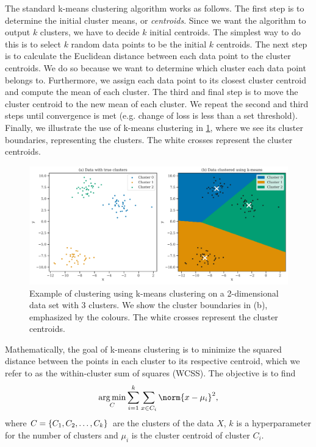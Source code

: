 The standard k-means clustering algorithm works as follows. The first step is to determine the initial cluster means, or \textit{centroids}. Since we want the algorithm to output $k$ clusters, we have to decide $k$ initial centroids. The simplest way to do this is to select $k$ random data points to be the initial $k$ centroids. The next step is to calculate the Euclidean distance between each data point to the cluster centroids. We do so because we want to determine which cluster each data point belongs to. Furthermore, we assign each data point to its closest cluster centroid and compute the mean of each cluster. The third and final step is to move the cluster centroid to the new mean of each cluster. We repeat the second and third steps until convergence is met (e.g. change of loss is less than a set threshold). Finally, we illustrate the use of k-means clustering in \cref{fig:k-means-clustering-2d-example}, where we see its cluster boundaries, representing the clusters. The white crosses represent the cluster centroids.
\begin{figure}[H]
    \centering
    \includegraphics[width=\textwidth]{thesis/figures/k-means-clustering-2d-example.pdf}
    \caption{Example of clustering using k-means clustering on a 2-dimensional data set with 3 clusters. We show the cluster boundaries in (b), emphasized by the colours. The white crosses represent the cluster centroids.}
    \label{fig:k-means-clustering-2d-example}
\end{figure}

Mathematically, the goal of k-means clustering is to minimize the squared distance between the points in each cluster to its respective centroid, which we refer to as the within-cluster sum of squares (WCSS). The objective is to find
\begin{align}
    \argmin_{C} \sumlim{i=1}{k} \sumlim{x \in C_i}{} \norm{x - \mu_i}^2,
\end{align}
where $C = \left\{C_1, C_2, \ldots, C_k\right\}$ are the clusters of the data $X$, $k$ is a hyperparameter for the number of clusters and $\mu_i$ is the cluster centroid of cluster $C_i$.

